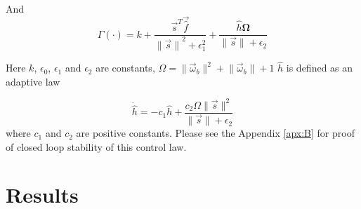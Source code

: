 And 
\begin{equation}
\Gamma(\cdot)=k+\frac{\vec{s}^T\vec{\hat{f}}}{{\lVert \vec{s} \rVert}^2+\epsilon_{1}^2}+ 
\frac{\hat{h}\mathbf{\Omega}}{\lVert \vec{s} \rVert + \epsilon_{2}}
\end{equation}

Here $k$, $\epsilon_0$, $\epsilon_1$ and $\epsilon_2$ are constants, $\Omega = \lVert\vec{\omega}_b\rVert^2 + \lVert\vec{\omega}_b\rVert + 1$ $\hat{h}$ is defined as an adaptive law

\begin{equation}
    \dot{\hat{h}} = -c_1\hat{h} + \frac{c_2\Omega\lVert\vec{s}\rVert^2}{\lVert\vec{s}\rVert+\epsilon_2}
\end{equation}
where $c_1$ and $c_2$ are positive constants.
Please see the Appendix \ref{apx:B} for proof of closed loop stability of this control law. 


\section{Results}
